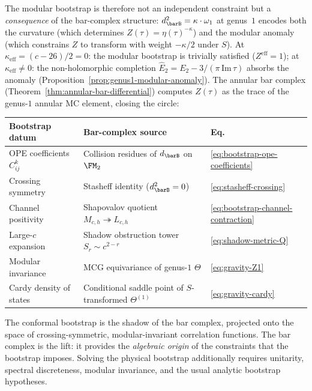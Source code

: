 \begin{remark}[Modular bootstrap = MCG equivariance of the
genus-$1$ bar complex]
The modular bootstrap is therefore not an independent constraint
but a \emph{consequence} of the bar-complex structure:
$d_{\barB}^2 = \kappa\cdot\omega_1$ at genus~$1$ encodes both
the curvature (which determines $Z(\tau) = \eta(\tau)^{-\kappa}$)
and the modular anomaly (which constrains $Z$ to transform
with weight $-\kappa/2$ under $S$). At $\kappa_{\mathrm{eff}}
= (c-26)/2 = 0$: the modular bootstrap is trivially satisfied
($Z^{\mathrm{eff}} = 1$); at $\kappa_{\mathrm{eff}} \ne 0$:
the non-holomorphic completion
$\widehat{E}_2 = E_2 - 3/(\pi\,\mathrm{Im}\,\tau)$
absorbs the anomaly
(Proposition~\ref{prop:genus1-modular-anomaly}). The annular
bar complex (Theorem~\ref{thm:annular-bar-differential})
computes $Z(\tau)$ as the trace of the genus-$1$ annular MC
element, closing the circle:
\begin{center}
\small
\begin{tabular}{lll}
\textbf{Bootstrap datum} & \textbf{Bar-complex source}
 & \textbf{Eq.} \\
\hline
OPE coefficients $C^k_{ij}$
 & Collision residues of $d_{\barB}$ on $\FM_2$
 & \eqref{eq:bootstrap-ope-coefficients} \\
Crossing symmetry
 & Stasheff identity ($d_{\barB}^2 = 0$)
 & \eqref{eq:stasheff-crossing} \\
Channel positivity
 & Shapovalov quotient $M_{c,h} \twoheadrightarrow L_{c,h}$
 & \eqref{eq:bootstrap-channel-contraction} \\
Large-$c$ expansion
 & Shadow obstruction tower $S_r \sim c^{2-r}$
 & \eqref{eq:shadow-metric-Q} \\
Modular invariance
 & MCG equivariance of genus-$1$ $\Theta$
 & \eqref{eq:gravity-Z1} \\
Cardy density of states
 & Conditional saddle point of $S$-transformed $\Theta^{(1)}$
 & \eqref{eq:gravity-cardy} \\
\end{tabular}
\end{center}
The conformal bootstrap is the shadow of the bar complex,
projected onto the space of crossing-symmetric, modular-invariant
correlation functions. The bar complex is the lift:
it provides the \emph{algebraic origin} of the constraints that
the bootstrap imposes. Solving the physical bootstrap additionally
requires unitarity, spectral discreteness, modular invariance, and the
usual analytic bootstrap hypotheses.
\end{remark}


